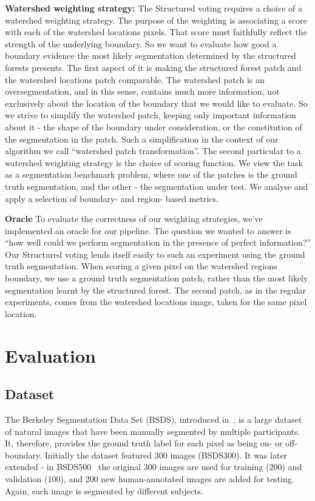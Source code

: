 \textbf{Watershed weighting strategy:} The Structured voting requires a choice of a watershed weighting strategy. The purpose of the weighting is associating a score with each of the watershed locations pixels. That score must faithfully reflect the strength of the underlying boundary. So we want to evaluate how good a boundary evidence the most likely segmentation determined by the structured forests presents. The first aspect of it is making the structured forest patch and the watershed locations patch comparable. The watershed patch is an oversegmentation, and in this sense, contains much more information, not exclusively about the location of the boundary that we would like to evaluate. So we strive to simplify the watershed patch, keeping only important information about it - the shape of the boundary under consideration, or the constitution of the segmentation in the patch. Such a simplification in the context of our algorithm we call ``watershed patch transformation''. The second particular to a watershed weighting strategy is the choice of scoring function. We view the task as a segmentation benchmark problem, where one of the patches is the ground truth segmentation, and the other - the segmentation under test. We analyse and apply a selection of boundary- and region- based metrics.

\textbf{Oracle} To evaluate the correctness of our weighting strategies, we've implemented an oracle for our pipeline. The question we wanted to answer is ``how well could we perform segmentation in the presence of perfect information?'' Our Structured voting lends itself easily to such an experiment using the ground truth segmentation. When scoring a given pixel on the watershed regions boundary, we use a ground truth segmentation patch, rather than the most likely segmentation learnt by the structured forest. The second patch, as in the regular experiments, comes from the watershed locations image, taken for the same pixel location.

\section{Evaluation}
\subsection{Dataset}
The Berkeley Segmentation Data Set (BSDS), introduced in~\cite{Martin01}, is a large dataset of natural images that have been manually segmented by multiple participants. It, therefore, provides the ground truth label for each pixel as being on- or off-boundary. Initially the dataset featured 300 images (BSDS300). It was later extended - in BSDS500~\cite{Arbelaez11} the original 300 images are used for training (200) and validation (100), and 200 new human-annotated images are added for testing. Again, each image is segmented by different subjects.

